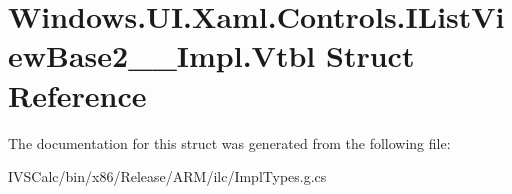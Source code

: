\hypertarget{struct_windows_1_1_u_i_1_1_xaml_1_1_controls_1_1_i_list_view_base2_____impl_1_1_vtbl}{}\section{Windows.\+U\+I.\+Xaml.\+Controls.\+I\+List\+View\+Base2\+\_\+\+\_\+\+Impl.\+Vtbl Struct Reference}
\label{struct_windows_1_1_u_i_1_1_xaml_1_1_controls_1_1_i_list_view_base2_____impl_1_1_vtbl}


The documentation for this struct was generated from the following file\+:\begin{DoxyCompactItemize}
\item 
I\+V\+S\+Calc/bin/x86/\+Release/\+A\+R\+M/ilc/Impl\+Types.\+g.\+cs\end{DoxyCompactItemize}
